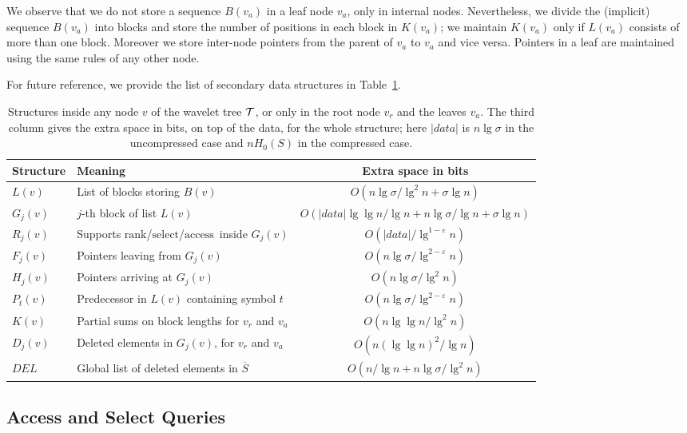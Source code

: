 \documentclass[11pt]{article}
\def\idrm#1{\ensuremath{\mathrm{#1}}}
\newcommand{\cT}{{\cal T}}
\newcommand{\cP}{{ K}}
\newcommand{\oS}{\overline{S}}
\newcommand{\ra}{\idrm{rank}}
\newcommand{\sel}{\idrm{select}}
\newcommand{\acc}{\idrm{access}}
\newcommand{\eps}{\varepsilon}
\begin{document}
We observe that we do not store a sequence $B(v_a)$ in a leaf node
$v_a$, only in internal nodes. Nevertheless, we divide the (implicit) sequence 
$B(v_a)$ into blocks and store the  number of positions in each 
block in $\cP(v_a)$; we maintain $\cP(v_a)$ only if $L(v_a)$ consists of more than one block. Moreover we store inter-node pointers from 
the parent of $v_a$ to $v_a$ and vice versa.
Pointers in a leaf are maintained using the same rules of any other node.

For future reference, we provide the list of secondary data structures in Table~\ref{tab:not}.

\begin{table}
\caption{Structures inside any node $v$ of the wavelet tree $\cT$, 
or only in the root node $v_r$ and the leaves $v_a$. The third column gives
the extra space in bits, on top of the data, for the whole structure; here
$|data|$ is $n\lg\sigma$ in the uncompressed case and $nH_0(S)$ in the
compressed case.}
\label{tab:not}
\begin{center}
\begin{tabular}{l|l|c}
Structure & Meaning & Extra space in bits \\
\hline
$L(v)$ & List of blocks storing $B(v)$ & $O(n\lg\sigma/\lg^2 n + \sigma\lg n)$ \\
$G_j(v)$ & $j$-th block of list $L(v)$ & $O(|data|\lg\lg n/\lg n + n\lg\sigma/\lg n+\sigma\lg n)$ \\
$R_j(v)$ & Supports \ra/\sel/\acc\ inside $G_j(v)$ & $O(|data|/\lg^{1-\eps} n)$ \\
$F_j(v)$ & Pointers leaving from $G_j(v)$ & $O(n\lg\sigma/\lg^{2-\eps} n)$\\
$H_j(v)$ & Pointers arriving at $G_j(v)$ & $O(n\lg\sigma/\lg^2 n)$ \\
$P_t(v)$ & Predecessor in $L(v)$ containing symbol $t$ & $O(n\lg\sigma/\lg^{2-\eps} n)$ \\
$\cP(v)$ & Partial sums on block lengths for $v_r$ and $v_a$ & $O(n\lg\lg n/\lg^2 n)$ \\
$D_j(v)$ & Deleted elements in $G_j(v)$, for $v_r$ and $v_a$ & $O(n(\lg\lg n)^2 / \lg n)$ \\
$DEL$    & Global list of deleted elements in $\oS$ & $O(n/\lg n + n\lg\sigma/\lg^2 n)$ \\
\end{tabular}
\end{center}
\end{table}


\subsection{Access and Select Queries}
\end{document}
